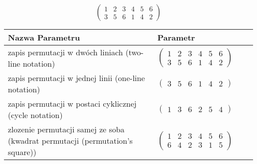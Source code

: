 \documentclass[12pt]{article}
\begin{document}
\subsection{}
\begin{center}
\[
\begin{pmatrix}
	1 & 2 & 3 & 4 & 5 & 6 \\ 
	3 & 5 & 6 & 1 & 4 & 2 
\end{pmatrix}
\]

\begin{tabular}{|m{0.6\linewidth}|m{0.4\linewidth}|}
	\hline
	Nazwa Parametru & Parametr \\
	\hline
	zapis permutacji w dwóch liniach (two-line notation) & $\begin{pmatrix} 1 & 2 & 3 & 4 & 5 & 6 \\ 
3 & 5 & 6 & 1 & 4 & 2 \end{pmatrix}$ \\ 
	\hline
	zapis permutacji w jednej linii (one-line notation) & $\begin{pmatrix} 3 & 5 & 6 & 1 & 4 & 2 \end{pmatrix}$ \\ 
	\hline
	zapis permutacji w postaci cyklicznej (cycle notation) & $\begin{pmatrix} 1 & 3 & 6 & 2 & 5 & 4 \end{pmatrix} $ \\ 
	\hline
	zlozenie permutacji samej ze soba (kwadrat permutacji (permutation's square)) & $\begin{pmatrix} 1 & 2 & 3 & 4 & 5 & 6 \\ 
6 & 4 & 2 & 3 & 1 & 5 \end{pmatrix}$ \\ 
	\hline
\end{tabular}
\end{center}
\end{document}
